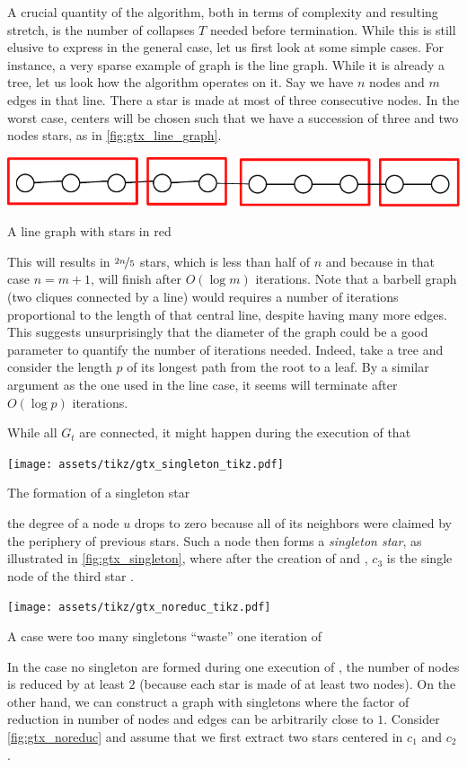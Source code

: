 A crucial quantity of the \gtx{} algorithm, both in terms of complexity and resulting stretch, is
the number of collapses $T$ needed before termination. While this is still elusive to express in the
general case, let us first look at some simple cases. For instance, a very sparse example of graph
is the line graph. While it is already a tree, let us look how the \gtx{} algorithm operates on it.
Say we have $n$ nodes and $m$ edges in that line. There a star is made at most of three
consecutive nodes. In the worst case, centers will be chosen such that we have a succession of three
and two nodes stars, as in \autoref{fig:gtx_line_graph}.%
\begin{marginfigure}
  \centering
  \includegraphics[width=0.9\linewidth]{assets/tmp-code/line_graph.pdf}
  \caption{A line graph with stars in red}
  \label{fig:gtx_line_graph}
\end{marginfigure}
This will results in $\nicefrac{2n}{5}$ stars, which is less than half of $n$ and because in that
case $n=m+1$, \gtx{} will finish after $O(\log m)$ iterations. Note that a barbell graph (two
cliques connected by a line) would requires a number of iterations proportional to the length of that
central line, despite having many more edges. This suggests unsurprisingly that the diameter of the graph
could be a good parameter to quantify the number of iterations needed. Indeed, take a tree and consider
the length $p$ of its longest path from the root to a leaf. By a similar argument as the one used in
the line case, it seems \gtx{} will terminate after $O(\log p)$ iterations.

While all $G_t$ are connected, it might happen during the execution of \extractStar{} that%
\begin{marginfigure}
  \centering
  \texttt{[image: assets/tikz/gtx\_singleton\_tikz.pdf]}
  \caption{The formation of a singleton star}
  \label{fig:gtx_singleton}
\end{marginfigure}
the degree of a node $u$ drops to zero because all of its neighbors were claimed by the
periphery of previous stars. Such a node then forms a \emph{singleton star}, as illustrated in
\autoref{fig:gtx_singleton}, where after the creation of  and , $c_3$ is the
single node of the third star .%
\begin{marginfigure}
  \centering
  \texttt{[image: assets/tikz/gtx\_noreduc\_tikz.pdf]}
  \caption{A case were too many singletons \enquote{waste} one iteration of \gtx{}}
  \label{fig:gtx_noreduc}
\end{marginfigure}
In the case no singleton are formed during one execution of \extractStar{}, the number of nodes is
reduced by at least $2$ (because each star is made of at least two nodes). On the other hand, we can
construct a graph with singletons where the factor of reduction in number of nodes and edges can be
arbitrarily close to $1$. Consider \autoref{fig:gtx_noreduc} and assume that we first extract two stars
centered in $c_1$ and $c_2$.%

